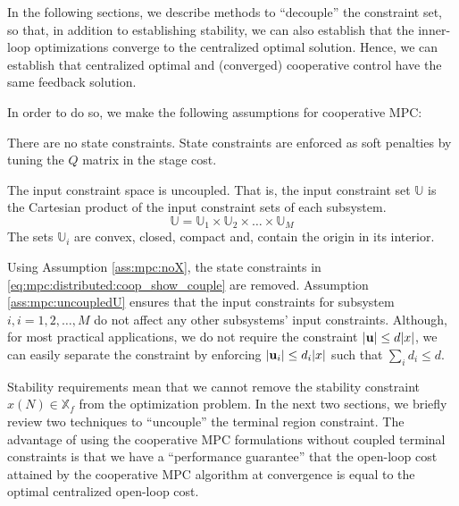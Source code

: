 In the following sections, we describe methods
to ``decouple'' the constraint set, so that, in addition to 
establishing stability, we can also establish that the inner-loop
optimizations converge to the centralized optimal solution. Hence, we
can establish that centralized optimal and (converged) cooperative control have
the same feedback solution.

In order to do so, we make the following assumptions for cooperative
MPC:
\begin{assumption}
\label{ass:mpc:noX}
There are no state constraints. State constraints are enforced as
soft penalties by tuning the $Q$ matrix in the stage cost.
\end{assumption}

\begin{assumption}
\label{ass:mpc:uncoupledU}
The input constraint space is uncoupled. That is, the input constraint
set $\mathbb{U}$ is the Cartesian product of the input constraint sets
of each subsystem. 
\[ \mathbb{U} = \mathbb{U}_1 \times \mathbb{U}_2 \times \ldots \times
\mathbb{U}_M
\]
The sets $\mathbb{U}_i$ are convex, closed, compact and, contain the origin in its interior.
\end{assumption}

Using Assumption \ref{ass:mpc:noX}, the state constraints in
\eqref{eq:mpc:distributed:coop_show_couple} are removed. Assumption
\ref{ass:mpc:uncoupledU} ensures that the input constraints for
subsystem $i, i = 1,2,\ldots,M$ do not affect any other subsystems'
input constraints. Although, for most practical applications, we do
not require the constraint $\vert \mathbf{u} \vert \leq d\vert x \vert$, we can
easily separate the constraint by enforcing $\vert \mathbf{u}_i \vert \leq
d_i\vert x \vert$ such that $\sum_i d_i \leq d$.

Stability requirements mean that we cannot remove the stability
constraint $x(N) \in \mathbb{X}_f$ from the optimization problem. 
In the next two sections, we briefly review
two techniques to ``uncouple'' the terminal region constraint. The
advantage of using the cooperative MPC formulations without coupled
terminal constraints is that we have a ``performance guarantee'' that
the open-loop cost attained by the cooperative MPC algorithm at
convergence is equal to the optimal centralized 
open-loop cost.

